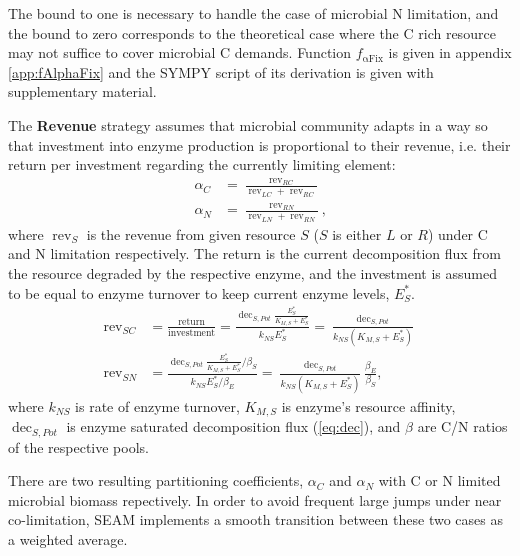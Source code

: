 \noindent
The bound to one is necessary to handle the case of microbial N
limitation, and the bound to zero corresponds to the theoretical case where the
C rich resource may not suffice to cover microbial C demands. 
Function $f_{\operatorname{{\alpha}Fix}}$ is given in appendix
\ref{app:fAlphaFix} and the SYMPY script of its 
derivation is given with supplementary material. 

The \textbf{Revenue} strategy assumes that microbial community adapts in a way
so that investment into enzyme production is proportional to their revenue, i.e.
their return per investment regarding the currently limiting element:
\begin{subequations}
\label{eq:allocRev}
\begin{align}
\alpha_C &= \frac{\operatorname{rev}_{RC}}{\operatorname{rev}_{LC} + \operatorname{rev}_{RC}} 
\\
\alpha_N &= \frac{\operatorname{rev}_{RN}}{\operatorname{rev}_{LN} + \operatorname{rev}_{RN}} 
\text{,} 
\end{align}
\end{subequations}
where $\operatorname{rev}_S$ is the revenue from given resource $S$ ($S$ is
either $L$ or $R$) under C and N limitation respectively. The return is the
current decomposition flux from the resource degraded by the respective enzyme,
and the investment is assumed to be equal to enzyme turnover to keep current
enzyme levels, $E_S^*$.
\begin{subequations}
\label{eq:allocRev2}
\begin{align}
\operatorname{rev}_{SC} &= \frac{\text{return}}{\text{investment}} 
= \frac{\operatorname{dec}_{S,Pot} \frac{E_S^*}{K_{M,S} + E_S^*}} {k_{NS}E_S^*} 
= \frac{\operatorname{dec}_{S,Pot}} {k_{NS}(K_{M,S} + E_S^*)} \\ 
\operatorname{rev}_{SN} &= \frac{\operatorname{dec}_{S,Pot}
\frac{E_S^*}{K_{M,S} + E_S^*} / \beta_S} {k_{NS} E_S^* / \beta_E} 
= \frac{\operatorname{dec}_{S,Pot}}{k_{NS} (K_{M,S} + E_S^*)} 
\frac{\beta_E}{\beta_S}
\text{,} 
\end{align}
\end{subequations}
where $k_{NS}$ is rate of enzyme turnover, $K_{M,S}$ is enzyme's resource
affinity, $\operatorname{dec}_{S,Pot}$ is
enzyme saturated decomposition flux (\ref{eq:dec}), and $\beta$ are C/N ratios
of the respective pools.

There are two resulting partitioning coefficients, $\alpha_C$ and $\alpha_N$
with C or N limited microbial biomass repectively. In order to avoid frequent large jumps
under near co-limitation, SEAM implements a smooth transition between these two
cases as a weighted average.

